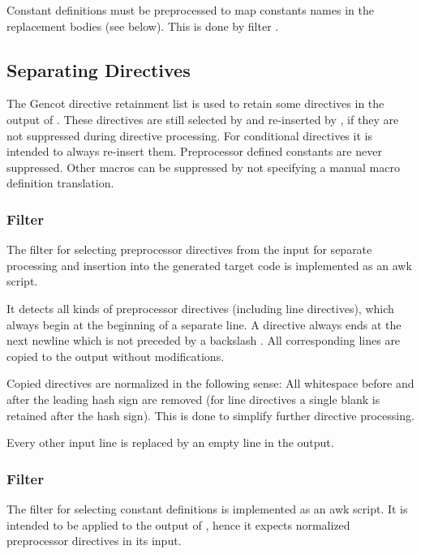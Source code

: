 Constant definitions must be preprocessed to map constants names in the replacement bodies (see below). This
is done by filter .

\subsection{Separating Directives}

The Gencot directive retainment list is used to retain some directives in the output of .
These directives are still selected by  and re-inserted by , if they
are not suppressed during directive processing. For conditional directives it is intended to always re-insert
them. Preprocessor defined constants are never suppressed. Other macros can be suppressed by not specifying
a manual macro definition translation.

\subsubsection{Filter }

The filter for selecting preprocessor directives from the input for separate processing and insertion into
the generated target code is implemented as an awk script.

It detects all kinds of preprocessor directives (including line directives), which always begin at the 
beginning of a separate line.
A directive always ends at the next newline which is not preceded by a backslash \code{\\}. All corresponding
lines are copied to the output without modifications.

Copied directives are normalized in the following sense: All whitespace before and after the leading hash
sign are removed (for line directives a single blank is retained after the hash sign). This is done to 
simplify further directive processing.

Every other input line is replaced by an empty line in the output.

\subsubsection{Filter }

The filter for selecting constant definitions is implemented as an awk script. It is intended to be applied 
to the output of , hence it expects normalized preprocessor directives in its input.

